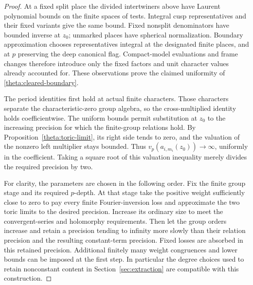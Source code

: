 \begin{proof}
At a fixed split place the divided intertwiners above have Laurent
polynomial bounds on the finite spaces of tests.  Integral cusp
representatives and their fixed variants give the same bound.
Fixed nonsplit denominators have bounded inverse at $z_0$;
unmarked places have spherical normalization.  Boundary
approximation chooses representatives integral at the designated
finite places, and at $p$ preserving the deep canonical flag.
Compact-model evaluations and frame changes therefore introduce
only the fixed factors and unit character values already
accounted for.  These observations prove the claimed uniformity
of \eqref{theta:cleared-boundary}.

The period identities first hold at actual finite characters.
Those characters separate the characteristic-zero group algebra,
so the cross-multiplied identity holds coefficientwise.  The
uniform bounds permit substitution at $z_0$ to the increasing
precision for which the finite-group relations hold.  By
Proposition~\ref{theta:toric-limit}, its right side tends to zero,
and the valuation of the nonzero left multiplier stays bounded.
Thus $v_p(a_{i,m_i}(z_0))\to\infty$, uniformly in the coefficient.
Taking a square root of this valuation inequality merely divides
the required precision by two.

For clarity, the parameters are chosen in the following order.
Fix the finite group stage and its required $p$-depth.  At that
stage take the positive weight sufficiently close to zero to pay
every finite Fourier-inversion loss and approximate the two
toric limits to the desired precision.  Increase its ordinary
size to meet the convergent-series and holomorphy requirements.
Then let the group orders increase and retain a precision
tending to infinity more slowly than their relation precision
and the resulting constant-term precision.  Fixed losses are
absorbed in this retained precision.  Additional finitely many
weight congruences and lower bounds can be imposed at the first
step.  In particular the degree choices used to retain
nonconstant content in Section~\ref{sec:extraction} are compatible
with this construction.
\end{proof}
